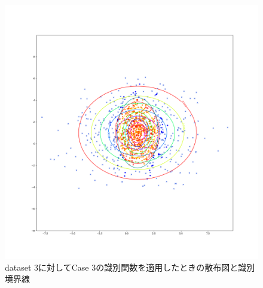\documentclass[class=jsarticle, crop=false, dvipdfmx, fleqn]{standalone}
\begin{document}
\begin{figure}
    \centering
    \includegraphics[clip, width=\linewidth]{../figures/result_assignment1_dataset3_case3.png}
    \caption{dataset 3に対してCase 3の識別関数を適用したときの散布図と識別境界線}
    \label{fig:result_dataset3_case3}
\end{figure}
\end{document}
